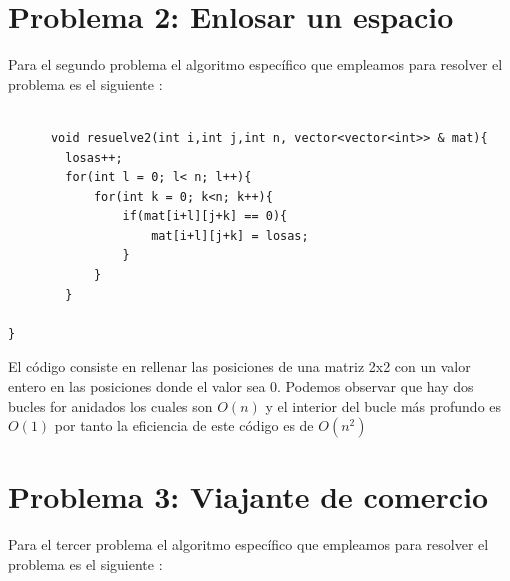 \documentclass[11pt,openany]{book}
\begin{document}
\section{Problema 2: Enlosar un espacio }
Para el segundo problema el algoritmo específico que empleamos para resolver el problema es el siguiente :

\begin{lstlisting}

      void resuelve2(int i,int j,int n, vector<vector<int>> & mat){
        losas++;
        for(int l = 0; l< n; l++){
            for(int k = 0; k<n; k++){
                if(mat[i+l][j+k] == 0){
                    mat[i+l][j+k] = losas;
                }
            }
        }
    
}
\end{lstlisting}
El código consiste en rellenar las posiciones de una matriz 2x2 con un valor entero en las posiciones donde el valor sea 0.
Podemos observar que hay dos bucles for anidados los cuales son $O(n)$ y el interior del bucle más profundo es $O(1)$ por tanto la eficiencia
de este código es de $O(n^2)$

\section{Problema 3: Viajante de comercio }
Para el tercer problema el algoritmo específico que empleamos para resolver el problema es el siguiente :
\end{document}
